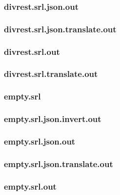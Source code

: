 \subsubsection{divrest.srl.json.out}
\label{app:divrest_srl.json.out}

\subsubsection{divrest.srl.json.translate.out}
\label{app:divrest_srl.json.translate.out}

\subsubsection{divrest.srl.out}
\label{app:divrest_srl.out}

\subsubsection{divrest.srl.translate.out}
\label{app:divrest_srl.translate.out}

\subsubsection{empty.srl}
\label{app:empty_srl}

\subsubsection{empty.srl.json.invert.out}
\label{app:empty_srl.json.invert.out}

\subsubsection{empty.srl.json.out}
\label{app:empty_srl.json.out}

\subsubsection{empty.srl.json.translate.out}
\label{app:empty_srl.json.translate.out}

\subsubsection{empty.srl.out}
\label{app:empty_srl.out}

